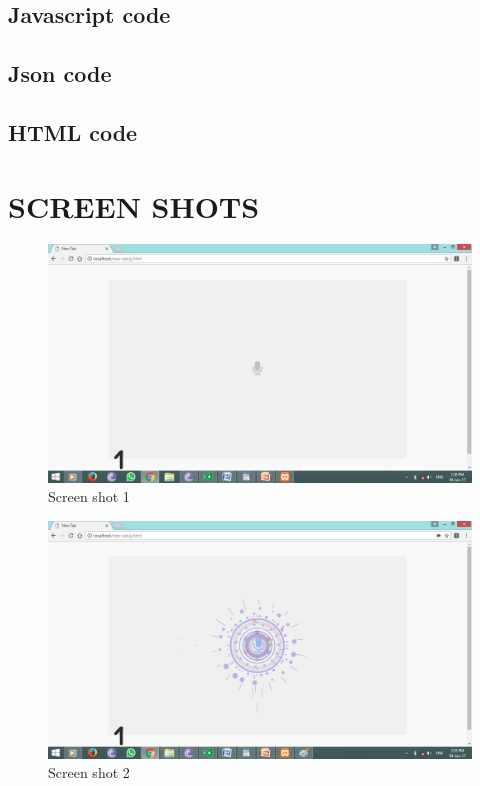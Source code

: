 \documentclass[12pt]{report} %
\begin{document}
\subsection{Javascript code}
\label{subsec:Javascript code}

\subsection{Json code}
\label{subsec:Json code}

\subsection{HTML code}
\label{subsec:HTML code}


\section{SCREEN SHOTS} 
\label{App:SCREEN SHOTS}


\begin{figure}[h]
	\centering
	\includegraphics[width=\linewidth]{figures/screen1.jpg}
	\caption{Screen shot 1}
	\label{fig:Screen short 1}
\end{figure}

\begin{figure}[h]
	\centering
	\includegraphics[width=\linewidth]{figures/screen2.jpg}
	\caption{Screen shot 2}
	\label{fig:Screen short 2}
\end{figure}
\end{document}
